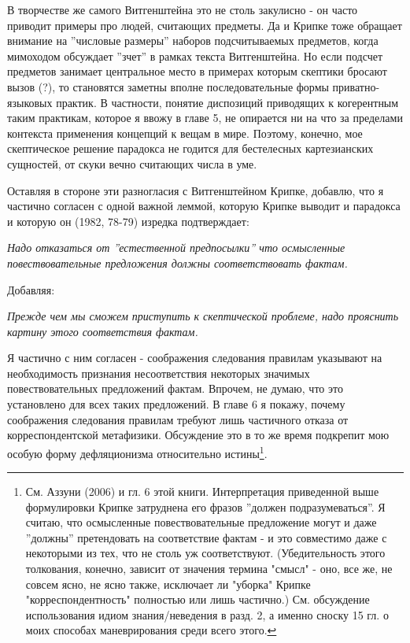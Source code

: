 \documentclass{book}
\begin{document}
В творчестве же самого Витгенштейна это не столь закулисно - он часто приводит примеры про людей, считающих предметы. Да и Крипке тоже обращает внимание на ''числовые размеры'' наборов подсчитываемых предметов, когда мимоходом обсуждает ''зчет'' в рамках текста Витгенштейна. Но если подсчет предметов занимает центральное место в примерах которым скептики бросают вызов (?), то становятся заметны вполне последовательные формы приватно-языковых практик. В частности, понятие диспозиций приводящих к когерентным таким практикам, которое я ввожу в главе 5, не опирается ни на что за пределами контекста применения концепций к вещам в мире. Поэтому, конечно, мое скептическое решение парадокса не годится для бестелесных картезианских сущностей, от скуки вечно считающих числа в уме.

Оставляя в стороне эти разногласия с Витгенштейном Крипке, добавлю, что я частично согласен с одной важной леммой, которую Крипке выводит и парадокса и которую он (1982, 78-79) изредка подтверждает:

\textit{Надо отказаться от ''естественной предпосылки'' что осмысленные повествовательные предложения должны соответствовать фактам.}

Добавляя:

\textit{Прежде чем мы сможем приступить к скептической проблеме, надо прояснить картину этого соответствия фактам.}

Я частично с ним согласен - соображения следования правилам указывают на необходимость признания несоответствия некоторых значимых повествовательных предложений фактам. Впрочем, не думаю, что это установлено для всех таких предложений. В главе 6 я покажу, почему соображения следования правилам требуют лишь частичного отказа от корреспондентской метафизики. Обсуждение это в то же время подкрепит мою особую форму дефляционизма относительно истины\footnote{См. Аззуни (2006) и гл. 6 этой книги. Интерпретация приведенной выше формулировки Крипке затруднена его фразов ''должен подразумеваться''. Я считаю, что осмысленные повествовательные предложение могут и даже ''должны'' претендовать на соответствие фактам - и это совместимо даже с некоторыми из тех, что не столь уж соответствуют. (Убедительность этого толкования, конечно, зависит от значения термина "смысл" - оно, все же, не совсем ясно, не ясно также, исключает ли "уборка" Крипке "корреспондентность" полностью или лишь частично.) См. обсуждение использования идиом знания/неведения в разд. 2, а именно сноску 15 гл. о моих способах маневрирования среди всего этого.}.
\end{document}
